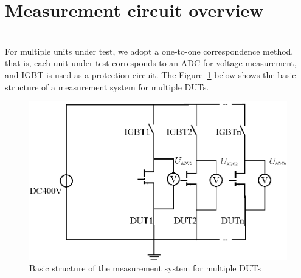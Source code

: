 \section{Measurement circuit overview}
\label{sec:Measurement circuit overview}
\\
For multiple units under test, we adopt a one-to-one correspondence method, that is, each unit under test corresponds to an ADC for voltage measurement, and IGBT is used as a protection circuit.
The Figure~\ref{fig:3.1} below shows the basic structure of a measurement system for multiple DUTs.
\begin{figure}[!ht]
	\centering
	\includegraphics[width=15cm]{grafiken/3.1.eps}
	\caption{Basic structure of the measurement system for multiple DUTs} 
	\label{fig:3.1}
\end{figure}
\FloatBarrier

\\
